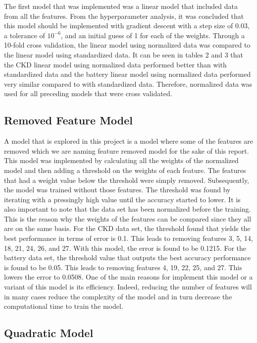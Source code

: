 \documentclass{article}
\begin{document}
The first model that was implemented was a linear model that included data from all the features.  From the hyperparameter analysis, it was concluded that this model should be implemented with gradient descent with a step size of 0.03, a tolerance of $10^{-6}$, and an initial guess of 1 for each of the weights.  Through a 10-fold cross validation, the linear model using normalized data was compared to the linear model using standardized data.  It can be seen in tables 2 and 3 that the CKD linear model using normalized data performed better than with standardized data and the battery linear model using normalized data performed very similar compared to with standardized data.  Therefore, normalized data was used for all preceding models that were cross validated. 


\subsection{Removed Feature Model}
A model that is explored in this project is a model where some of the features are removed which we are naming feature removed model for the sake of this report. This model was implemented by calculating all the weights of the normalized model and then adding a threshold on the weights of each feature. The features that had a weight value below the threshold were simply removed.  Subsequently, the model was trained without those features. The threshold was found by iterating with a pressingly high value until the accuracy started to lower. It is also important to note that the data set has been normalized before the training. This is the reason why the weights of the features can be compared since they all are on the same basis. For the CKD data set, the threshold found that yields the best performance in terms of error is 0.1. This leads to removing features 3, 5, 14, 18, 21, 24, 26, and 27. With this model, the error is found to be 0.1215. For the battery data set, the threshold value that outputs the best accuracy performance is found to be 0.05.  This leads to removing features 4, 19, 22, 25, and 27. This lowers the error to 0.0508. One of the main reasons for implement this model or a variant of this model is its efficiency. Indeed, reducing the number of features will in many cases reduce the complexity of the model and in turn decrease the computational time to train the model. 

\subsection{Quadratic Model}
\end{document}
